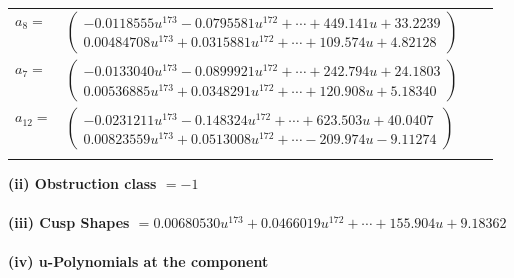 \documentclass[1p]{elsarticle_modified}
\theoremstyle{definition}
\begin{document}
\begin{tabular}{m{7pt} m{180pt} m{7pt} m{180pt} }
\flushright $a_{8}=$&$\begin{pmatrix}-0.0118555 u^{173}-0.0795581 u^{172}+\cdots+449.141 u+33.2239\\0.00484708 u^{173}+0.0315881 u^{172}+\cdots+109.574 u+4.82128\end{pmatrix}$ \\
\flushright $a_{7}=$&$\begin{pmatrix}-0.0133040 u^{173}-0.0899921 u^{172}+\cdots+242.794 u+24.1803\\0.00536885 u^{173}+0.0348291 u^{172}+\cdots+120.908 u+5.18340\end{pmatrix}$ \\
\flushright $a_{12}=$&$\begin{pmatrix}-0.0231211 u^{173}-0.148324 u^{172}+\cdots+623.503 u+40.0407\\0.00823559 u^{173}+0.0513008 u^{172}+\cdots-209.974 u-9.11274\end{pmatrix}$\\&\end{tabular}
\flushleft \textbf{(ii) Obstruction class $= -1$}\\~\\
\flushleft \textbf{(iii) Cusp Shapes $= 0.00680530 u^{173}+0.0466019 u^{172}+\cdots+155.904 u+9.18362$}\\~\\
\newpage\renewcommand{\arraystretch}{1}
\flushleft \textbf{(iv) u-Polynomials at the component}\newline \\
\end{document}
